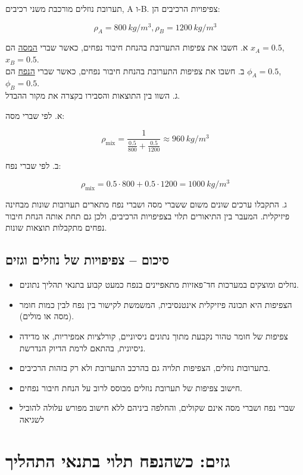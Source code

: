 \documentclass[
  hebrew,
  letterpaper,
  DIV=11,
  numbers=noendperiod]{scrreprt}
\begin{document}
תערובת נוזלים מורכבת משני רכיבים, A ו-B. צפיפויות הרכיבים הן:

\[\rho_{A} = 800\text{ }kg/m^{3},\rho_{B} = 1200\text{ }kg/m^{3}\]

א. חשבו את צפיפות התערובת בהנחת חיבור נפחים, כאשר שברי \ul{המסה} הם
\(x_{A} = 0.5\), \(x_{B} = 0.5\).\\
ב. חשבו את צפיפות התערובת בהנחת חיבור נפחים, כאשר שברי \ul{הנפח} הם
\(\phi_{A} = 0.5\), \(\phi_{B} = 0.5\).\\
ג. השוו בין התוצאות והסבירו בקצרה את מקור ההבדל.

א. לפי שברי מסה:

\[\rho_{\text{mix}} = \frac{1}{\frac{0.5}{800} + \frac{0.5}{1200}} \approx 960\text{ }kg/m^{3}\]

ב. לפי שברי נפח:

\[\rho_{\text{mix}} = 0.5 \cdot 800 + 0.5 \cdot 1200 = 1000\text{ }kg/m^{3}\]

ג. התקבלו ערכים שונים משום ששברי מסה ושברי נפח מתארים תערובות שונות
מבחינה פיזיקלית. המעבר בין התיאורים תלוי בצפיפויות הרכיבים, ולכן גם תחת
אותה הנחת חיבור נפחים מתקבלות תוצאות שונות.

\subsection{סיכום -- צפיפויות של נוזלים
וגזים}\label{ux5e1ux5d9ux5dbux5d5ux5dd-ux5e6ux5e4ux5d9ux5e4ux5d5ux5d9ux5d5ux5ea-ux5e9ux5dc-ux5e0ux5d5ux5d6ux5dcux5d9ux5dd-ux5d5ux5d2ux5d6ux5d9ux5dd}

\begin{itemize}
\item
  נוזלים ומוצקים במערכות חד־פאזיות מתאפיינים בנפח כמעט קבוע בתנאי תהליך
  נתונים.
\item
  הצפיפות היא תכונה פיזיקלית אינטנסיבית, המשמשת לקישור בין נפח לבין כמות
  חומר (מסה או מולים).
\item
  צפיפות של חומר טהור נקבעת מתוך נתונים ניסיוניים, קורלציות אמפיריות, או
  מדידה ניסיונית, בהתאם לרמת הדיוק הנדרשת.
\item
  בתערובות נוזלים, הצפיפות תלויה גם בהרכב התערובת ולא רק בזהות הרכיבים.
\item
  חישוב צפיפות של תערובת נוזלים מבוסס לרוב על הנחת חיבור נפחים.
\item
  שברי נפח ושברי מסה אינם שקולים, והחלפה ביניהם ללא חישוב מפורש עלולה
  להוביל לשגיאה
\end{itemize}

\section{גזים: כשהנפח תלוי בתנאי
התהליך}\label{ux5d2ux5d6ux5d9ux5dd-ux5dbux5e9ux5d4ux5e0ux5e4ux5d7-ux5eaux5dcux5d5ux5d9-ux5d1ux5eaux5e0ux5d0ux5d9-ux5d4ux5eaux5d4ux5dcux5d9ux5da}
\end{document}
